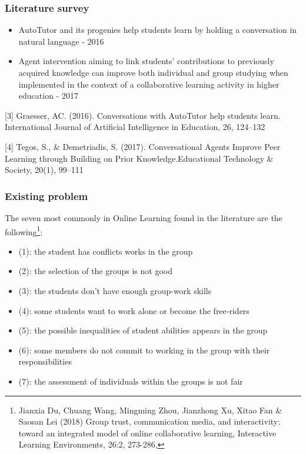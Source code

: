 \documentclass{beamer}
\begin{document}
\begin{frame}
\frametitle{Literature survey}
\begin{itemize}
\item AutoTutor and its progenies \cite{Graesser2016} help students learn by holding a conversation in natural language - 2016
\item Agent intervention aiming to link students' contributions to previously acquired knowledge can improve both individual and group studying when implemented in the context of a collaborative learning activity in higher education \cite {Tegos} - 2017
\end{itemize}
\begin{thebibliography}{01}
{\scriptsize 

 [3]	Graesser, AC. (2016). Conversations with AutoTutor help students learn.
International Journal of Artificial Intelligence in Education, 26, 124–132	

 [4] Tegos,  S.,  \&  Demetriadis,  S.  (2017). Conversational  Agents  Improve Peer  Learning  through  Building  on Prior  Knowledge.Educational Technology \& Society, 20(1), 99–111}
\end{thebibliography}
\end{frame}
\begin{frame}
\frametitle{ Existing problem}
The seven most commonly in Online Learning found in the literature are the following\footnote{{\tiny Jianxia Du, Chuang Wang, Mingming Zhou, Jianzhong Xu, Xitao Fan \& Saosan Lei (2018) Group trust, communication media, and interactivity: toward an integrated model of online collaborative learning, Interactive Learning Environments, 26:2, 273-286,}
}:
{\footnotesize \begin{itemize}
		\item (1): the student has conflicts works in the group
		\item (2): the selection of the groups is not good
		\item (3): the students don't have enough group-work skills
		\item (4):  some students want to work alone or become the free-riders
		\item (5):  the possible inequalities of student abilities appears in the group
		\item (6):  some members do not commit to working in the group with their responsibilities
		\item (7): the assessment of individuals within the groups is not fair
\end{itemize}}


\end{frame}
\end{document}

